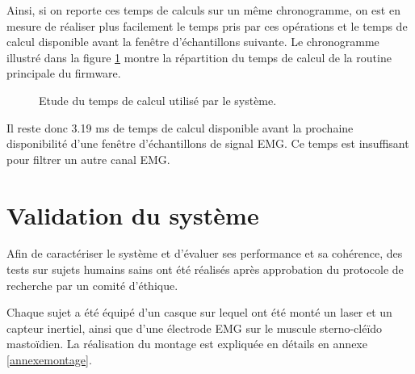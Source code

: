 \documentclass[letterpaper, twoside, 12pt, memoire, creativecommons, hyperref]{thETS}
\begin{document}
Ainsi, si on reporte ces temps de calculs sur un même chronogramme, on est en mesure de réaliser plus facilement le temps pris par ces opérations et le temps de calcul disponible avant la fenêtre d'échantillons suivante. Le chronogramme illustré dans la figure \ref{fig:chronogrammeDisc} montre la répartition du temps de calcul de la routine principale du firmware. 

\begin{figure}
	\centering
	\caption{Etude du temps de calcul utilisé par le système.}
	\label{fig:chronogrammeDisc}
\end{figure}

Il reste donc 3.19 ms de temps de calcul disponible avant la prochaine disponibilité d'une fenêtre d'échantillons de signal EMG. Ce temps est insuffisant pour filtrer un autre canal EMG.

\section{Validation du système}

Afin de caractériser le système et d'évaluer ses performance et sa cohérence, des tests sur sujets humains sains ont été réalisés après approbation du protocole de recherche par un comité d'éthique. 

Chaque sujet a été équipé d'un casque sur lequel ont été monté un laser et un capteur inertiel, ainsi que d'une électrode EMG sur le muscule sterno-cléïdo mastoïdien. La réalisation du montage est expliquée en détails en annexe \ref{annexemontage}.
\end{document}
